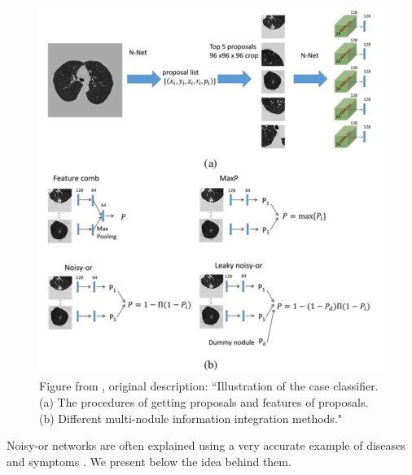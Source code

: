 \documentclass[12pt]{article}
\begin{document}
\begin{figure}[h!]
\centering
\includegraphics[scale = 0.45]{liao2.png}
\caption{Figure from \citep{liao2017evaluate}, original description:  ``Illustration of the case classifier. (a) The procedures of getting proposals and features of proposals. (b) Different multi-nodule information integration methods." }
\end{figure}

Noisy-or networks are often explained using a very accurate example of diseases and symptoms \citep{arora2017provable}. We present below the idea behind them.
\end{document}
